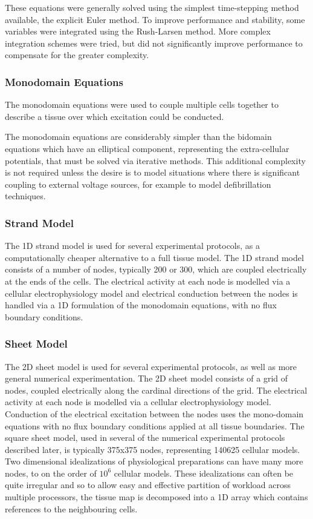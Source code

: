 These equations were generally solved using the simplest time-stepping method
available, the explicit Euler method.  To improve performance and stability,
some variables were integrated using the Rush-Larsen method.  More complex
integration schemes were tried, but did not significantly improve performance to
compensate for the greater complexity.

\subsubsection{Monodomain Equations}

The monodomain equations were used to couple multiple cells together to describe
a tissue over which excitation could be conducted.



The monodomain equations are considerably simpler than the bidomain equations
which have an elliptical component, representing the extra-cellular potentials,
that must be solved via iterative methods.  This additional complexity is not
required unless the desire is to model situations where there is significant
coupling to external voltage sources, for example to model defibrillation
techniques.

\subsubsection{Strand Model}

The 1D strand model is used for several experimental protocols, as
a computationally cheaper alternative to a full tissue model.  The 1D strand
model consists of a number of nodes, typically 200 or 300, which are coupled
electrically at the ends of the cells.  The electrical activity at each node is
modelled via a cellular electrophysiology model and electrical conduction between the
nodes is handled via a 1D formulation of the monodomain equations, with no
flux boundary conditions.

\subsubsection{Sheet Model}

The 2D sheet model is used for several experimental protocols, as well as more
general numerical experimentation.  The 2D sheet model consists of a grid of
nodes, coupled electrically along the cardinal directions of the grid.  The
electrical activity at each node is modelled via a cellular electrophysiology
model.  Conduction of the electrical excitation between the nodes uses the
mono-domain equations with no flux boundary conditions applied at all tissue
boundaries.  The square sheet model, used in several of the numerical
experimental protocols described later, is typically 375x375 nodes, representing
140625 cellular models.  Two dimensional idealizations of physiological
preparations can have many more nodes, to on the order of $10^{6}$ cellular
models.  These idealizations can often be quite irregular and so to allow easy
and effective partition of workload across multiple processors, the tissue map
is decomposed into a 1D array which contains references to the neighbouring
cells.


